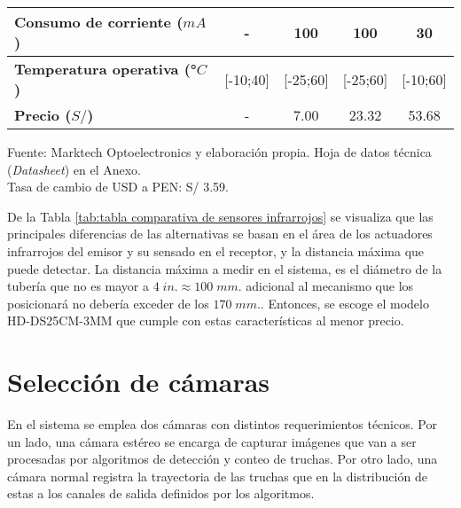 \begin{mytable}[H]
\begin{tabular}{l|c|c|c|c|}
{			\begin{minipage}{\myforthmaxsizeofcontenttable}	
				\textbf{Consumo de corriente ($mA$)}
			\end{minipage}
		} & -  & 100 & 100 & 30         \\ \hline
		\multicolumn{1}{|l|}{
			\begin{minipage}{\myforthmaxsizeofcontenttable}	
				\textbf{Temperatura operativa (°$C$)}
			\end{minipage}
		} & [-10;40] & [-25;60] & [-25;60] & [-10;60] \\ \hline
		\multicolumn{1}{|l|}{
			\begin{minipage}{\myforthmaxsizeofcontenttable}	
				\textbf{Precio ($S/$)}
			\end{minipage}
		} & - & 7.00 & 23.32 & 53.68 \\ \hline
	\end{tabular}
	\begin{myflushcenteraftertable}	
		Fuente: Marktech Optoelectronics y elaboración propia. Hoja de datos técnica (\textit{Datasheet}) en el Anexo.\\
		Tasa de cambio de USD a PEN: S/ 3.59.
	\end{myflushcenteraftertable}
\end{mytable}

De la Tabla \ref{tab:tabla comparativa de sensores infrarrojos} se visualiza que las principales diferencias de las alternativas se basan en el área de los actuadores infrarrojos del emisor y su sensado en el receptor, y la distancia máxima que puede detectar. La distancia máxima a medir en el sistema, es el diámetro de la tubería que no es mayor a $4 \; in. \approx 100 \; mm.$ adicional al mecanismo que los posicionará no debería exceder de los $170 \; mm.$. Entonces, se escoge el modelo HD-DS25CM-3MM que cumple con estas características al menor precio.

\section{Selección de cámaras} 

En el sistema se emplea dos cámaras con distintos requerimientos técnicos. Por un lado, una cámara estéreo se encarga de capturar imágenes que van a ser procesadas por algoritmos de detección y conteo de truchas. Por otro lado, una cámara normal registra la trayectoria de las truchas que en la distribución de estas a los canales de salida definidos por los algoritmos. 


